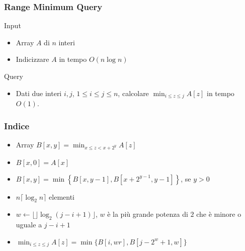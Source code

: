 \begin{frame}
  \titlepage
\end{frame}


\begin{frame}[fragile]
\frametitle{Range Minimum Query}
\begin{block}{Input}
\begin{itemize}
\item
Array $A$ di $n$ interi
\item
Indicizzare $A$ in tempo $O(n \log n)$
\end{itemize}
\end{block}
\begin{block}{Query}
\begin{itemize}
\item
Dati due interi $i, j$, $1\le i\le j\le n$, calcolare $\min_{i\le z\le j}A[z]$ in tempo $O(1)$.
\end{itemize}
\end{block}
\end{frame}

\begin{frame}[fragile]
\frametitle{Indice}
\begin{itemize}
\item
Array $B[x,y] = \min_{x\le z < x+2^{y}}A[z] $
\item
$B[x,0] = A[x] $
\item
$B[x,y] = \min \left\{ B[x,y-1], B[x + 2^{y-1},y-1] \right\}$, se $y>0$
\item
$n \lceil  \log_{2} n \rceil$ elementi
\item
$w\gets \lfloor   \rfloor\log_{2} (j-i+1) \rfloor$, $w$ è la più grande potenza di $2$ che è minore o uguale
a $j-i+1$
\item
$\min_{i\le z\le j}A[z] = \min \{ B[i, wr], B[j - 2^{w} + 1, w]\}$
\end{itemize}
\end{frame}


